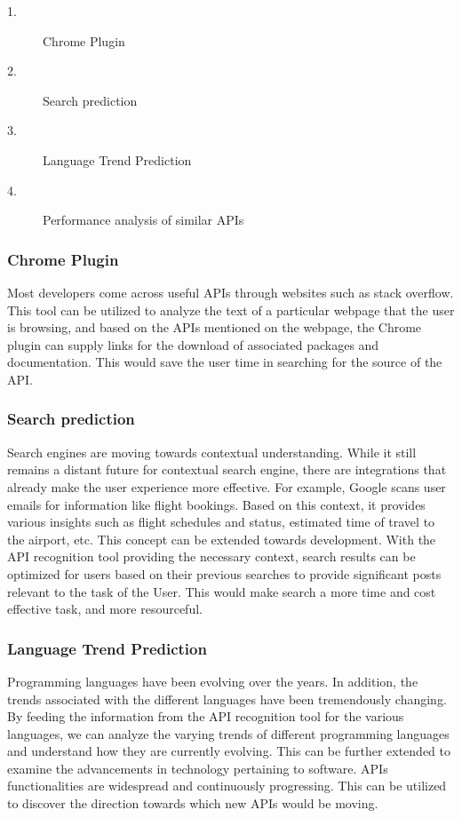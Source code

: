 \documentclass{sig-alternate-05-2015}
\begin{document}
\begin{description}
\item[1.]Chrome Plugin
\item[2.]Search prediction
\item[3.]Language Trend Prediction
\item[4.]Performance analysis of similar APIs
\end{description}

\subsubsection{Chrome Plugin}
Most developers come across useful APIs through websites such as stack overflow. This tool can be utilized to analyze the text of a particular webpage that the user is browsing, and based on the APIs mentioned on the webpage, the Chrome plugin can supply links for the download of associated packages and documentation. This would save the user time in searching for the source of the API. 

\subsubsection{Search prediction}
Search engines are moving towards contextual understanding. While it still remains a distant future for contextual search engine, there are integrations that already make the user experience more effective. For example, Google scans user emails for information like flight bookings. Based on this context, it provides various insights such as flight schedules and status, estimated time of travel to the airport, etc. This concept can be extended towards development. With the API recognition tool providing the necessary context, search results can be optimized for users based on their previous searches to provide significant posts relevant to the task of the User. This would make search a more time and cost effective task, and more resourceful.

\subsubsection{Language Trend Prediction}
Programming languages have been evolving over the years. In addition, the trends associated with the different languages have been tremendously changing. By feeding the information from the API recognition tool for the various languages, we can analyze the varying trends of different programming languages and understand how they are currently evolving. This can be further extended to examine the advancements in technology pertaining to software. APIs functionalities are widespread and continuously progressing. This can be utilized to discover the direction towards which new APIs would be moving. 
\end{document}

